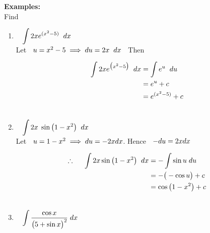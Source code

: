 \documentclass[11pt,a4paper]{article}
\begin{document}
\textbf{Examples:}\\

Find
\begin{enumerate}
\item $\hspace{0.3cm}\displaystyle{\int 2x e^{(x^2 - 5)}\hspace{0.2cm}dx}$\\

Let $\hspace{0.2cm} u = x^2 - 5 \implies du = 2x\hspace{0.2cm}dx\hspace{0.2cm}$ Then

\begin{align*}
\int 2x e^{\big(x^2 - 5\big)}\hspace{0.2cm}dx & = \int e^u\hspace{0.2cm}du\\
& = e^u + c\\
& = e^{(x^2 - 5)} + c\\\\
\end{align*}









\item $\hspace{0.3cm}\displaystyle{\int 2x\hspace{0.1cm}\sin \big( 1 - x^2\big)\hspace{0.2cm}dx}$\\

Let $\hspace{0.2cm} u = 1-x^2 \implies du = -2xdx$. Hence $\hspace{0.2cm} -du = 2xdx$

\begin{align*}
\therefore\hspace{0.5cm} \int 2x \sin \big( 1 - x^2\big)\hspace{0.2cm}dx & = -\int \sin u \hspace{0.1cm}du\\
& = -\big(-\cos u\big) + c\\
& = \cos \big(1 - x^2\big) + c\\\\
\end{align*}





\item $\hspace{0.3cm}\displaystyle{\int \dfrac{\cos x}{\big(5 + \sin x \big)^2}\hspace{0.1cm}dx}$\\


\end{enumerate}
\end{document}
